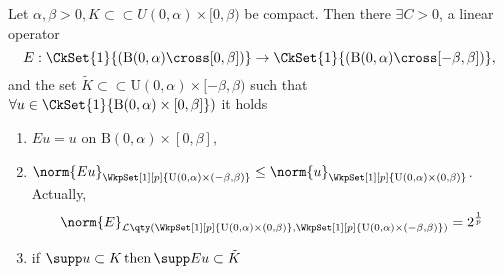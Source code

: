 \begin{lemma}
	Let $\alpha, \beta >0, K \subset \subset U(0,\alpha) \times [0,\beta)$ be compact. Then there $\exists C >0 $, a linear operator
	\[
		E:\CkSet{1}{(\text{B}(0,\alpha) \cross [0,\beta])} \to \CkSet{1}{(\text{B}(0,\alpha) \cross [-\beta, \beta])}, 
	\]
	and the set $\tilde{K} \subset \subset \text{U}(0,\alpha) \times [-\beta, \beta)$ such that $\forall u \in \CkSet{1}{\text{B}(0,\alpha) \times [0,\beta]})$ it holds
	\begin{enumerate}
		\item $Eu = u$ on $\text{B}(0,\alpha) \times [0,\beta]$,
		\item $\norm{Eu}_{\WkpSet[1][p]{\text{U}(0,\alpha) \times (-\beta,\beta)}} \leq \norm{u}_{\WkpSet[1][p]{\text{U}(0,\alpha) \times (0, \beta)}} $. Actually,
			\[
				\norm{E}_{\mathcal{L}\qty(\WkpSet[1][p]{\text{U}(0,\alpha)\times (0,\beta)},\WkpSet[1][p]{\text{U}(0,\alpha)\times(-\beta,\beta)})} = 2^{\frac{1}{p}}
			\]
		\item if $\supp u \subset K \, \text{then} \,\supp Eu \subset \tilde{K}$
	\end{enumerate}
\end{lemma}

